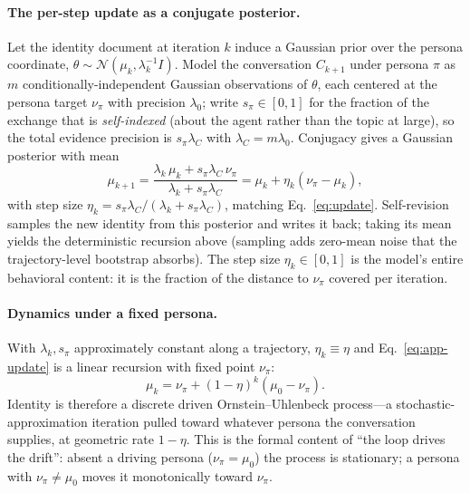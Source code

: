 \paragraph{The per-step update as a conjugate posterior.}
Let the identity document at iteration $k$ induce a Gaussian prior over the persona coordinate, $\theta\sim\mathcal{N}(\mu_k,\lambda_k^{-1}I)$. Model the conversation $C_{k+1}$ under persona $\pi$ as $m$ conditionally-independent Gaussian observations of $\theta$, each centered at the persona target $\nu_\pi$ with precision $\lambda_0$; write $s_\pi\in[0,1]$ for the fraction of the exchange that is \emph{self-indexed} (about the agent rather than the topic at large), so the total evidence precision is $s_\pi\lambda_C$ with $\lambda_C=m\lambda_0$. Conjugacy gives a Gaussian posterior with mean
\begin{equation}
\mu_{k+1}=\frac{\lambda_k\,\mu_k+s_\pi\lambda_C\,\nu_\pi}{\lambda_k+s_\pi\lambda_C}
=\mu_k+\eta_k(\nu_\pi-\mu_k),
\label{eq:app-update}
\end{equation}
with step size $\eta_k=s_\pi\lambda_C/(\lambda_k+s_\pi\lambda_C)$,
matching Eq.~\eqref{eq:update}. Self-revision samples the new identity from this posterior and writes it back; taking its mean yields the deterministic recursion above (sampling adds zero-mean noise that the trajectory-level bootstrap absorbs). The step size $\eta_k\in[0,1]$ is the model's entire behavioral content: it is the fraction of the distance to $\nu_\pi$ covered per iteration.

\paragraph{Dynamics under a fixed persona.}
With $\lambda_k,s_\pi$ approximately constant along a trajectory, $\eta_k\equiv\eta$ and Eq.~\eqref{eq:app-update} is a linear recursion with fixed point $\nu_\pi$:
\begin{equation}
\mu_k=\nu_\pi+(1-\eta)^k(\mu_0-\nu_\pi).
\label{eq:app-dynamics}
\end{equation}
Identity is therefore a discrete driven Ornstein--Uhlenbeck process---a stochastic-approximation iteration pulled toward whatever persona the conversation supplies, at geometric rate $1-\eta$. This is the formal content of ``the loop drives the drift'': absent a driving persona ($\nu_\pi=\mu_0$) the process is stationary; a persona with $\nu_\pi\ne\mu_0$ moves it monotonically toward $\nu_\pi$.


